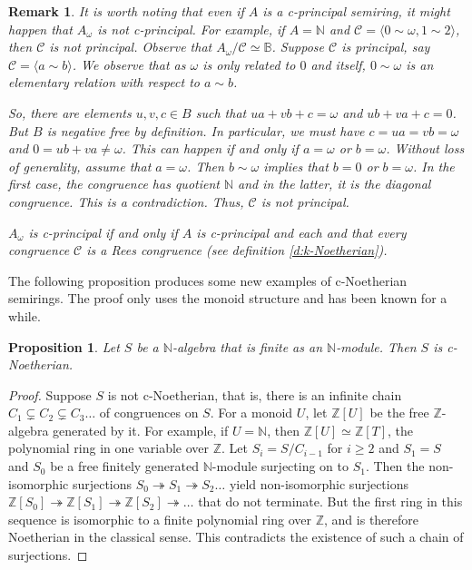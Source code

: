 \documentclass[notitlepage, 10pt]{article}
\theoremstyle{defin}
\theoremstyle{theo}
\newtheorem{prop}[defn]{Proposition}
\theoremstyle{rema}
\newtheorem{rem}{Remark}[section]
\newcommand{\N}{\mathbb{N}}
\newcommand{\Z}{\mathbb{Z}}
\newcommand{\bB}{\mathbb{B}}
\newcommand{\cC}{\mathcal{C}}
\begin{document}
\begin{rem}
     It is worth noting that even if $A$ is a c-principal semiring, it might happen that $A_\omega$ is not c-principal. For example, if $A=\N$ and $\cC = \langle 0 \sim \omega, 1\sim 2\rangle$, then $\cC$ is not principal. Observe that $A_\omega/\cC\simeq \bB$. Suppose $\cC$ is principal, say $\cC = \langle a\sim b \rangle$. We observe that as $\omega$ is only related to $0$ and itself, $0\sim \omega$ is an elementary relation with respect to $a\sim b$.
     
    So, there are elements $u,v,c\in B$ such that $ua+vb+c = \omega$ and $ub+va+c  =0$. But $B$ is negative free by definition. In particular, we must have $c=ua=vb=\omega$ and $0 = ub+va\neq \omega$. This can happen if and only if $a=\omega$ or $b=\omega$. Without loss of generality, assume that $a=\omega$. Then $b\sim \omega$ implies that $b=0$ or $b=\omega$. In the first case, the congruence has quotient $\N$ and in the latter, it is the diagonal congruence. This is a contradiction. Thus, $\cC$ is not principal.

    $A_\omega$ is c-principal if and only if $A$ is c-principal and each and that every congruence $\cC$ is a Rees congruence (see definition \ref{d:k-Noetherian}).
\end{rem}
    
The following proposition produces some new examples of c-Noetherian semirings. The proof only uses the monoid structure and has been known for a while. 

\begin{prop}
    \label{p:finc-Noetherian}
    Let $S$ be a $\N$-algebra that is finite as an $\N$-module. Then $S$ is c-Noetherian.
\end{prop}

\begin{proof}
    Suppose $S$ is not c-Noetherian, that is, there is an infinite chain $C_1\subsetneq C_2 \subsetneq C_3 \ldots$ of congruences on $S$. For a monoid $U$, let $\Z[U]$ be the free $\Z$-algebra generated by it. For example, if $U=\N$, then $\Z[U]\simeq \Z[T]$, the polynomial ring in one variable over $\Z$. Let $S_i = S/C_{i-1}$ for $i\geq 2$ and $S_1=S$ and $S_0$ be a free finitely generated $\N$-module surjecting on to $S_1$. Then the non-isomorphic surjections $S_0\twoheadrightarrow S_1 \twoheadrightarrow S_2\ldots$ yield non-isomorphic surjections $\Z[S_0]\twoheadrightarrow \Z[S_1] \twoheadrightarrow \Z[S_2]\twoheadrightarrow\ldots$ that do not terminate. But the first ring in this sequence is isomorphic to a finite polynomial ring over $\Z$, and is therefore Noetherian in the classical sense. This contradicts the existence of such a chain of surjections.
\end{proof}
\end{document}
